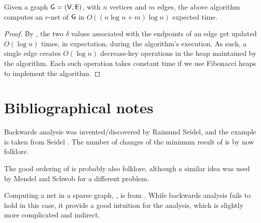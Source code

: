 \begin{theorem}%
    Given a graph $\mathsf{G} = (\mathsf{V}, \mathsf{E})$, with $n$ vertices
    and $m$ edges, the above algorithm computes an $r$-net of $\mathsf{G}$
    in $O( (n\log n+m)\log n)$ expected time.
\end{theorem}

\begin{proof}
    By , the two $\delta$ values associated with
    the endpoints of an edge get updated $O( \log n)$ times, in
    expectation, during the algorithm's execution. As such, a single
    edge creates $O(\log n)$ decrease-key operations in the heap
    maintained by the algorithm. Each such operation takes constant
    time if we use Fibonacci heaps to implement the algorithm.
\end{proof}%

\section{Bibliographical notes}

Backwards analysis was invented/discovered by Raimund Seidel, and the
\QuickSort example is taken from Seidel \cite{s-barga-93}.  The number
of changes of the minimum result of  is by now
folklore.

The good ordering of  is probably also folklore,
although a similar idea was used by Mendel and Schwob
\cite{ms-fckrp-09} for a different problem.

Computing a net in a sparse graph, , is from
\cite{ehs-ogpcd-14}. While backwards analysis fails to hold in this
case, it provide a good intuition for the analysis, which is slightly
more complicated and indirect.


\ChapterEnd{}
% 
